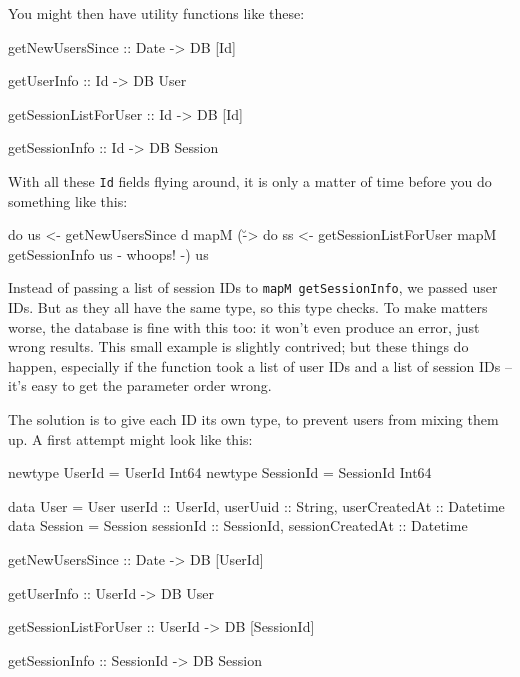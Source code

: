 \documentclass{tmr}
\begin{document}
You might then have utility functions like these:

\begin{code}
getNewUsersSince :: Date -> DB [Id]

getUserInfo :: Id -> DB User

getSessionListForUser :: Id -> DB [Id]

getSessionInfo :: Id -> DB Session
\end{code}

With all these \lstinline|Id| fields flying around, it is only a matter of time before you do something like this:

\begin{code}
do us <- getNewUsersSince d
   mapM (\u -> do ss <- getSessionListForUser
                  mapM getSessionInfo us {- whoops! -}) us
\end{code}%

Instead of passing a list of session IDs to \lstinline|mapM getSessionInfo|, we passed user IDs.  But as they all have the same type, so this type checks. To make matters worse, the database is fine with this too: it won't even produce an error, just wrong results.  This small example is slightly contrived; but these things do happen, especially if the function took a list of user IDs and a list of session IDs -- it's easy to get the parameter order wrong.

The solution is to give each ID its own type, to prevent users from mixing them up.  A first attempt might look like this:

\begin{code}
newtype UserId = UserId Int64
newtype SessionId = SessionId Int64

data User = User { userId :: UserId,
                   userUuid :: String,
                   userCreatedAt :: Datetime }
data Session = Session { sessionId :: SessionId,
                         sessionCreatedAt :: Datetime }

getNewUsersSince :: Date -> DB [UserId]

getUserInfo :: UserId -> DB User

getSessionListForUser :: UserId -> DB [SessionId]

getSessionInfo :: SessionId -> DB Session
\end{code}
\end{document}
